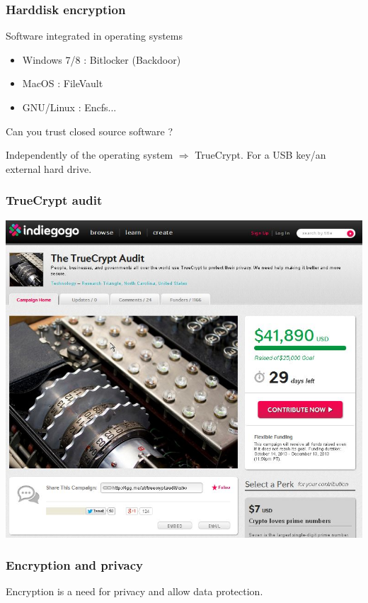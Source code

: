 \begin{frame}

\frametitle{Harddisk encryption}
\begin{block}{Software integrated in operating systems}
\begin{itemize}
\item Windows 7/8 : Bitlocker (Backdoor)
\item MacOS : FileVault
\item GNU/Linux : Encfs...
\end{itemize}
Can you trust closed source software ?
\end{block}

\begin{block}{Independently of the operating system}
$\Rightarrow$ TrueCrypt. For a USB key/an external hard drive.
\end{block}
\end{frame}

\begin{frame}
\frametitle{TrueCrypt audit}
\begin{center}
\includegraphics[scale=0.45] {./materials/truecryptaudit.jpg} 
\end{center}
\end{frame}

\begin{frame}
\frametitle{Encryption and privacy}
\huge{Encryption is a need for privacy and allow data protection.}
\end{frame}

